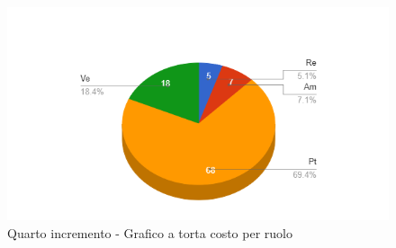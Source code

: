 {{\begin{longtable}{C{.4\freewidth} C{.2\freewidth} C{.2\freewidth} C{.2\freewidth} C{.2\freewidth} C{.2\freewidth} C{.2\freewidth} C{.2\freewidth} C{.2\freewidth}}
        \end{longtable}
        \begin{figure}[H]
          \includegraphics[width=15cm]{sezioni/images/quartoT.png}
          \centering
          \caption{Quarto incremento - Grafico a torta costo per ruolo}
       \end{figure}
    }
    }

